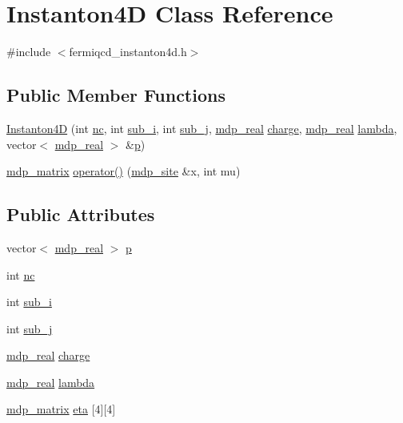 \hypertarget{class_instanton4_d}{
\section{Instanton4D Class Reference}
\label{class_instanton4_d}
}


{\ttfamily \#include $<$fermiqcd\_\-instanton4d.h$>$}\subsection*{Public Member Functions}
\begin{DoxyCompactItemize}
\item 
\hyperlink{class_instanton4_d_ab23484422ea50f59e0856d51cce1cb8b}{Instanton4D} (int \hyperlink{class_instanton4_d_af8271a542264493caafca9443b0c2f38}{nc}, int \hyperlink{class_instanton4_d_a33c37212ef923556b7a1985d9e7cdd36}{sub\_\-i}, int \hyperlink{class_instanton4_d_af73c30a26883977d21e2b2e8921429cf}{sub\_\-j}, \hyperlink{mdp__global__vars_8h_a049e4c1d4e74d644878a42f9909463e4}{mdp\_\-real} \hyperlink{class_instanton4_d_a81408020baf1ea808456d691c65425e2}{charge}, \hyperlink{mdp__global__vars_8h_a049e4c1d4e74d644878a42f9909463e4}{mdp\_\-real} \hyperlink{class_instanton4_d_a69a7961ae8d9ea823cacbf8cc11bc46f}{lambda}, vector$<$ \hyperlink{mdp__global__vars_8h_a049e4c1d4e74d644878a42f9909463e4}{mdp\_\-real} $>$ \&\hyperlink{class_instanton4_d_a3d78aada54a0f8e7bafb5272cb5ca401}{p})
\item 
\hyperlink{classmdp__matrix}{mdp\_\-matrix} \hyperlink{class_instanton4_d_aa03767e0f05830b33e34b3be0f9fc447}{operator()} (\hyperlink{classmdp__site}{mdp\_\-site} \&x, int mu)
\end{DoxyCompactItemize}
\subsection*{Public Attributes}
\begin{DoxyCompactItemize}
\item 
vector$<$ \hyperlink{mdp__global__vars_8h_a049e4c1d4e74d644878a42f9909463e4}{mdp\_\-real} $>$ \hyperlink{class_instanton4_d_a3d78aada54a0f8e7bafb5272cb5ca401}{p}
\item 
int \hyperlink{class_instanton4_d_af8271a542264493caafca9443b0c2f38}{nc}
\item 
int \hyperlink{class_instanton4_d_a33c37212ef923556b7a1985d9e7cdd36}{sub\_\-i}
\item 
int \hyperlink{class_instanton4_d_af73c30a26883977d21e2b2e8921429cf}{sub\_\-j}
\item 
\hyperlink{mdp__global__vars_8h_a049e4c1d4e74d644878a42f9909463e4}{mdp\_\-real} \hyperlink{class_instanton4_d_a81408020baf1ea808456d691c65425e2}{charge}
\item 
\hyperlink{mdp__global__vars_8h_a049e4c1d4e74d644878a42f9909463e4}{mdp\_\-real} \hyperlink{class_instanton4_d_a69a7961ae8d9ea823cacbf8cc11bc46f}{lambda}
\item 
\hyperlink{classmdp__matrix}{mdp\_\-matrix} \hyperlink{class_instanton4_d_ae318efcecc72b47fb7b43bcf0222697f}{eta} \mbox{[}4\mbox{]}\mbox{[}4\mbox{]}
\end{DoxyCompactItemize}


